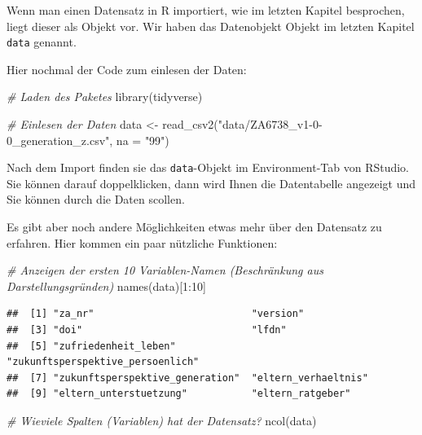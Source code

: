 \documentclass[
]{book}
\newenvironment{Shaded}{\begin{snugshade}}{\end{snugshade}}
\newcommand{\AttributeTok}[1]{\textcolor[rgb]{0.77,0.63,0.00}{#1}}
\newcommand{\CommentTok}[1]{\textcolor[rgb]{0.56,0.35,0.01}{\textit{#1}}}
\newcommand{\DecValTok}[1]{\textcolor[rgb]{0.00,0.00,0.81}{#1}}
\newcommand{\FunctionTok}[1]{\textcolor[rgb]{0.00,0.00,0.00}{#1}}
\newcommand{\NormalTok}[1]{#1}
\newcommand{\OtherTok}[1]{\textcolor[rgb]{0.56,0.35,0.01}{#1}}
\newcommand{\SpecialCharTok}[1]{\textcolor[rgb]{0.00,0.00,0.00}{#1}}
\newcommand{\StringTok}[1]{\textcolor[rgb]{0.31,0.60,0.02}{#1}}
\begin{document}
Wenn man einen Datensatz in R importiert, wie im letzten Kapitel besprochen, liegt dieser als Objekt vor. Wir haben das Datenobjekt Objekt im letzten Kapitel \texttt{data} genannt.

Hier nochmal der Code zum einlesen der Daten:

\begin{Shaded}
\begin{Highlighting}[]
\CommentTok{\# Laden des Paketes}
\FunctionTok{library}\NormalTok{(tidyverse)}

\CommentTok{\# Einlesen der Daten}
\NormalTok{data }\OtherTok{\textless{}{-}} \FunctionTok{read\_csv2}\NormalTok{(}\StringTok{"data/ZA6738\_v1{-}0{-}0\_generation\_z.csv"}\NormalTok{, }\AttributeTok{na =} \StringTok{"99"}\NormalTok{)}
\end{Highlighting}
\end{Shaded}

Nach dem Import finden sie das \texttt{data}-Objekt im Environment-Tab von RStudio. Sie können darauf doppelklicken, dann wird Ihnen die Datentabelle angezeigt und Sie können durch die Daten scollen.

Es gibt aber noch andere Möglichkeiten etwas mehr über den Datensatz zu erfahren. Hier kommen ein paar nützliche Funktionen:

\begin{Shaded}
\begin{Highlighting}[]
\CommentTok{\# Anzeigen der ersten 10 Variablen{-}Namen (Beschränkung aus Darstellungsgründen)}
\FunctionTok{names}\NormalTok{(data)[}\DecValTok{1}\SpecialCharTok{:}\DecValTok{10}\NormalTok{]}
\end{Highlighting}
\end{Shaded}

\begin{verbatim}
##  [1] "za_nr"                           "version"                        
##  [3] "doi"                             "lfdn"                           
##  [5] "zufriedenheit_leben"             "zukunftsperspektive_persoenlich"
##  [7] "zukunftsperspektive_generation"  "eltern_verhaeltnis"             
##  [9] "eltern_unterstuetzung"           "eltern_ratgeber"
\end{verbatim}

\begin{Shaded}
\begin{Highlighting}[]
\CommentTok{\# Wieviele Spalten (Variablen) hat der Datensatz?}
\FunctionTok{ncol}\NormalTok{(data)}
\end{Highlighting}
\end{Shaded}
\end{document}
